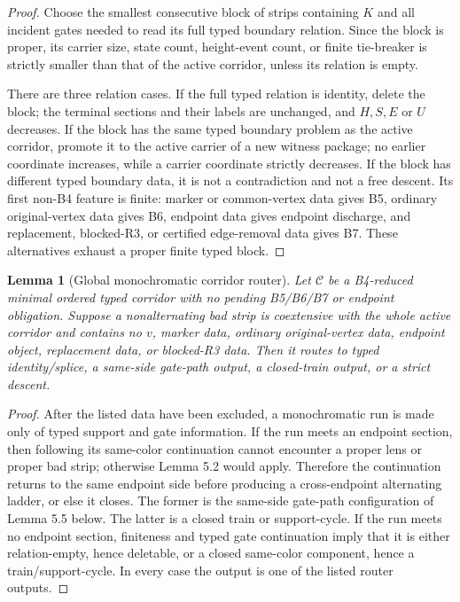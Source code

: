 \documentclass[11pt]{amsart}
\newtheorem{lemma}[theorem]{Lemma}
\theoremstyle{definition}
\begin{document}
\begin{proof}
Choose the smallest consecutive block of strips containing \(K\) and all incident gates needed to read its full typed boundary relation. Since the block is proper, its carrier size, state count, height-event count, or finite tie-breaker is strictly smaller than that of the active corridor, unless its relation is empty.

There are three relation cases. If the full typed relation is identity, delete the block; the terminal sections and their labels are unchanged, and \(H,S,E\) or \(U\) decreases. If the block has the same typed boundary problem as the active corridor, promote it to the active carrier of a new witness package; no earlier coordinate increases, while a carrier coordinate strictly decreases. If the block has different typed boundary data, it is not a contradiction and not a free descent. Its first non-B4 feature is finite: marker or common-vertex data gives B5, ordinary original-vertex data gives B6, endpoint data gives endpoint discharge, and replacement, blocked-R3, or certified edge-removal data gives B7. These alternatives exhaust a proper finite typed block.

\end{proof}
\begin{lemma}[Global monochromatic corridor router]
Let \(\mathcal C\) be a B4-reduced minimal ordered typed corridor with no pending B5/B6/B7 or endpoint obligation. Suppose a nonalternating bad strip is coextensive with the whole active corridor and contains no \(v\), marker data, ordinary original-vertex data, endpoint object, replacement data, or blocked-R3 data. Then it routes to typed identity/splice, a same-side gate-path output, a closed-train output, or a strict descent.

\end{lemma}
\begin{proof}
After the listed data have been excluded, a monochromatic run is made only of typed support and gate information. If the run meets an endpoint section, then following its same-color continuation cannot encounter a proper lens or proper bad strip; otherwise Lemma 5.2 would apply. Therefore the continuation returns to the same endpoint side before producing a cross-endpoint alternating ladder, or else it closes. The former is the same-side gate-path configuration of Lemma 5.5 below. The latter is a closed train or support-cycle. If the run meets no endpoint section, finiteness and typed gate continuation imply that it is either relation-empty, hence deletable, or a closed same-color component, hence a train/support-cycle. In every case the output is one of the listed router outputs.

\end{proof}
\end{document}
